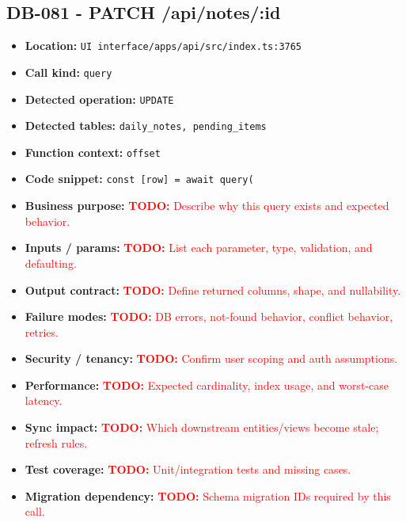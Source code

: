\documentclass[11pt]{article}
\newcommand{\todoitem}[1]{\textcolor{red}{\textbf{TODO:} #1}}
\begin{document}
\subsection{DB-081 - PATCH /api/notes/:id}
\begin{itemize}[leftmargin=1.5em]
\item \textbf{Location:} \texttt{UI interface/apps/api/src/index.ts:3765}
\item \textbf{Call kind:} \texttt{query}
\item \textbf{Detected operation:} \texttt{UPDATE}
\item \textbf{Detected tables:} \texttt{daily\_notes, pending\_items}
\item \textbf{Function context:} \texttt{offset}
\item \textbf{Code snippet:} \texttt{const [row] = await query(}
\item \textbf{Business purpose:} \todoitem{Describe why this query exists and expected behavior.}
\item \textbf{Inputs / params:} \todoitem{List each parameter, type, validation, and defaulting.}
\item \textbf{Output contract:} \todoitem{Define returned columns, shape, and nullability.}
\item \textbf{Failure modes:} \todoitem{DB errors, not-found behavior, conflict behavior, retries.}
\item \textbf{Security / tenancy:} \todoitem{Confirm user scoping and auth assumptions.}
\item \textbf{Performance:} \todoitem{Expected cardinality, index usage, and worst-case latency.}
\item \textbf{Sync impact:} \todoitem{Which downstream entities/views become stale; refresh rules.}
\item \textbf{Test coverage:} \todoitem{Unit/integration tests and missing cases.}
\item \textbf{Migration dependency:} \todoitem{Schema migration IDs required by this call.}
\end{itemize}
\end{document}
